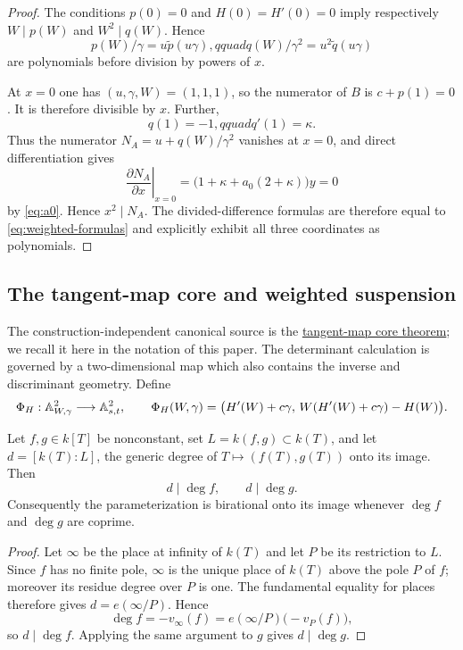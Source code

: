\begin{proof}
The conditions $p(0)=0$ and $H(0)=H'(0)=0$ imply respectively
$W\mid p(W)$ and $W^2\mid q(W)$.  Hence
\[
 p(W)/\gamma=u\widetilde p(u\gamma),qquad
 q(W)/\gamma^2=u^2\widetilde q(u\gamma)
\]
are polynomials before division by powers of $x$.

At $x=0$ one has $(u,\gamma,W)=(1,1,1)$, so the numerator of $B$ is
$c+p(1)=0$.  It is therefore divisible by $x$.  Further,
\[
 q(1)=-1,qquad q'(1)=\kappa.
\]
Thus the numerator $N_A=u+q(W)/\gamma^2$ vanishes at $x=0$, and direct
differentiation gives
\[
 \left.\frac{\partial N_A}{\partial x}\right|_{x=0}
 =\bigl(1+\kappa+a_0(2+\kappa)\bigr)y=0
\]
by \eqref{eq:a0}.  Hence $x^2\mid N_A$.  The divided-difference formulas are
therefore equal to \eqref{eq:weighted-formulas} and explicitly exhibit all
three coordinates as polynomials.
\end{proof}

\subsection{The tangent-map core and weighted suspension}

The construction-independent canonical source is the
\href{../../verified/TANGENT_MAP_CORE.md}{tangent-map core theorem}; we
recall it here in the notation of this paper.  The determinant calculation is
governed by a two-dimensional map which also
contains the inverse and discriminant geometry.  Define
\begin{equation}\label{eq:tangent-core}
 \Phi_H:\mathbb A^2_{W,\gamma}\longrightarrow\mathbb A^2_{s,t},\qquad
 \Phi_H(W,\gamma)=
 \bigl(H'(W)+c\gamma,\,W(H'(W)+c\gamma)-H(W)\bigr).
\end{equation}

\begin{lemma}
\label{lem:coprime-coordinate-degrees}
Let $f,g\in k[T]$ be nonconstant, set $L=k(f,g)\subset k(T)$, and let
$d=[k(T):L]$, the generic degree of $T\mapsto(f(T),g(T))$ onto its image.
Then
\[
 d\mid\deg f,\qquad d\mid\deg g.
\]
Consequently the parameterization is birational onto its image whenever
$\deg f$ and $\deg g$ are coprime.
\end{lemma}

\begin{proof}
Let $\infty$ be the place at infinity of $k(T)$ and let $P$ be its
restriction to $L$.  Since $f$ has no finite pole, $\infty$ is the unique
place of $k(T)$ above the pole $P$ of $f$; moreover its residue degree over
$P$ is one.  The fundamental equality for places therefore gives
$d=e(\infty/P)$.  Hence
\[
 \deg f=-v_\infty(f)
 =e(\infty/P)\bigl(-v_P(f)\bigr),
\]
so $d\mid\deg f$.  Applying the same argument to $g$ gives
$d\mid\deg g$.
\end{proof}

